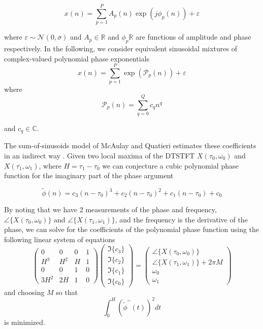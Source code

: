 \documentclass[letterpaper,12pt]{report}
\begin{document}
\begin{equation}
    x(n)=\sum_{p=1}^{P} A_p(n) \exp(j \phi_p(n)) + \varepsilon
\end{equation}

where $\varepsilon \sim \mathcal{N}(0,\sigma)$ and $A_p \in \mathbb{R}$ and
$\phi_p \mathbb{R}$ are functions of amplitude and phase respectively. In the
following, we consider equivalent sinusoidal mixtures of complex-valued
polynomial phase exponentials
\begin{equation}
    x(n)=\sum_{p=1}^{P} \exp(\mathcal{P}_p(n)) + \varepsilon
\end{equation}
where
\begin{equation}
    \mathcal{P}_p(n) = \sum_{q=0}^{Q} c_q n^{q}
\end{equation}

and $c_q \in \mathbb{C}$.

The sum-of-sinusoids model of McAulay and Quatieri estimates these coefficients
in an indirect way \cite{mcaulay1986speech}. Given two local maxima of the
DTSTFT $X(\tau_0,\omega_0)$ and $X(\tau_1,\omega_1)$, where $H = \tau_1 -
\tau_0$ we can conjecture a cubic
polynomial phase function for the imaginary part of the phase argument

\begin{equation}
    \tilde{\phi}(n) = c_3 (n-\tau_0)^3 + c_2 (n-\tau_0)^2 + c_1 (n-\tau_0) + c_0
\end{equation}

By noting that we have 2 measurements of the phase and frequency,
$\angle\{X(\tau_0,\omega_0)\}$ and $\angle\{X(\tau_1,\omega_1)\}$, and the frequency
is the derivative of the phase, we can solve for the coefficients of the
polynomial phase function using the following linear system of equations
\begin{equation}
    \begin{pmatrix}
        0   & 0     & 0 & 1 \\
        H^3 & H^2   & H & 1 \\
        0   & 0     & 1 & 0 \\
        3 H^2 & 2 H & 1 & 0
    \end{pmatrix}
    \begin{pmatrix}
        \Im\{c_3\} \\
        \Im\{c_2\} \\
        \Im\{c_1\} \\
        \Im\{c_0\}
    \end{pmatrix}
    =
    \begin{pmatrix}
        \angle\{X(\tau_0,\omega_0)\} \\
        \angle\{X(\tau_1,\omega_1)\} + 2 \pi M \\
        \omega_0 \\
        \omega_1        
    \end{pmatrix}
\end{equation}
and choosing $M$ so that
\begin{equation}
    \int_{0}^{H}(\tilde{\phi}^{\prime\prime}(t))^{2}dt
\end{equation}
is minimized.
\end{document}
